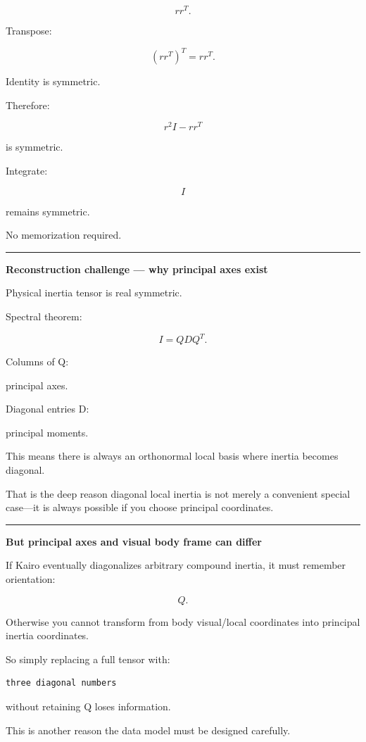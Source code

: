 \[
rr^T.
\]

Transpose:

\[
(rr^T)^T
=
rr^T.
\]

Identity is symmetric.

Therefore:

\[
r^2I-rr^T
\]

is symmetric.

Integrate:

\[
I
\]

remains symmetric.

No memorization required.

\begin{center}\rule{0.5\linewidth}{0.5pt}\end{center}

\textbf{Reconstruction challenge --- why principal axes exist}

Physical inertia tensor is real symmetric.

Spectral theorem:

\[
I=QDQ^T.
\]

Columns of Q:

principal axes.

Diagonal entries D:

principal moments.

This means there is always an orthonormal local basis where inertia becomes diagonal.

That is the deep reason diagonal local inertia is not merely a convenient special case---it is always possible if you choose principal coordinates.

\begin{center}\rule{0.5\linewidth}{0.5pt}\end{center}

\textbf{But principal axes and visual body frame can differ}

If Kairo eventually diagonalizes arbitrary compound inertia, it must remember orientation:

\[
Q.
\]

Otherwise you cannot transform from body visual/local coordinates into principal inertia coordinates.

So simply replacing a full tensor with:

\begin{verbatim}
three diagonal numbers
\end{verbatim}

without retaining Q loses information.

This is another reason the data model must be designed carefully.

